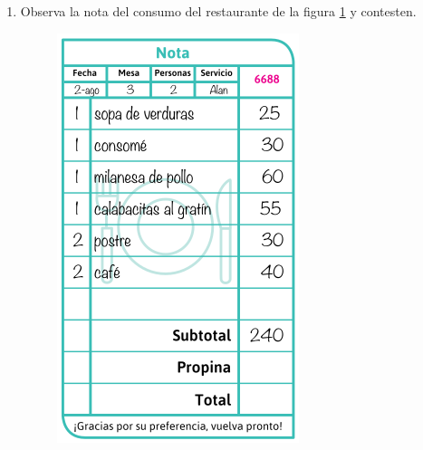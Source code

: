 \documentclass[11pt]{book}
\begin{document}
\begin{enumerate}
  \item Observa la nota del consumo del restaurante de la figura \ref{fig:nota_consumo} y
        contesten.

        \begin{minipage}[t]{0.2\textwidth}
          \begin{figure}[H]
            \centering
            \includegraphics[width=\linewidth]{nota_consumo.png}
            \label{fig:nota_consumo}
          \end{figure}

\end{minipage}
\end{enumerate}
\end{document}
